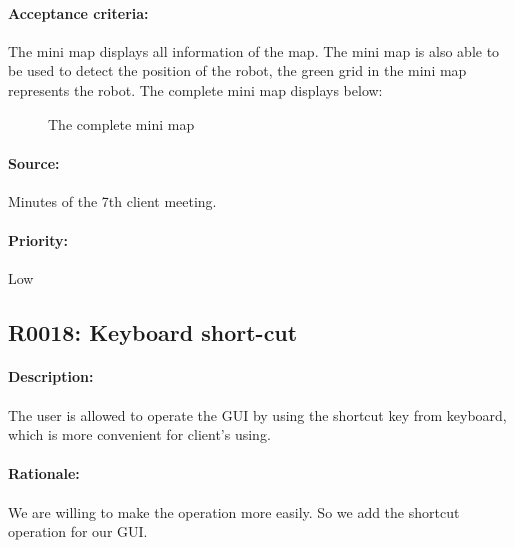 \documentclass[11pt, a4paper]{report}
\begin{document}
\paragraph{Acceptance criteria:}
The mini map displays all information of the map. The mini map is also able to be used to detect the position of the robot, the green grid in the mini map represents the robot. The complete mini map displays below:
\begin{figure}[ht]
\centering
\setlength\fboxsep{2pt}
\setlength\fboxrule{0.2pt}
\caption{The complete mini map}
\label{sec:NXJCC}
\label{fig:NXJCC}
\end{figure}

\paragraph{Source:}
Minutes of the 7th client meeting.
\paragraph{Priority:}
Low


\subsection{R0018: Keyboard short-cut}
\paragraph{Description:}
The user is allowed to operate the GUI by using the shortcut key from keyboard, which is more convenient for client's using.    
\paragraph{Rationale:}
We are willing to make the operation more easily. So we add the shortcut operation for our GUI.  
\end{document}
